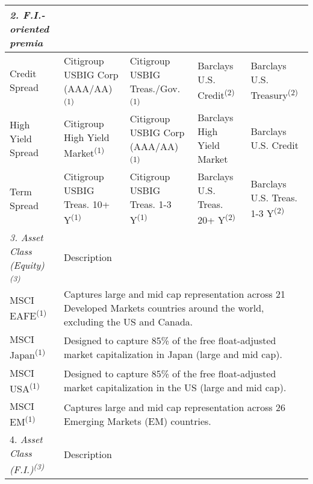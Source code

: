 \documentclass[12pt]{article}
\begin{document}
\begin{table}[H]
{\begin{tabular}{@{}lllll@{}}
\textit{2.   F.I.-oriented premia} & \textit{}                          &                                     &                                    &                                    \\ \midrule
Credit Spread                       & Citigroup USBIG Corp (AAA/AA)\textsuperscript{(1)}      & Citigroup USBIG Treas./Gov.\textsuperscript{(1)}         & Barclays U.S. Credit\textsuperscript{(2)}               & Barclays U.S. Treasury\textsuperscript{(2)}             \\
High Yield Spread                   & Citigroup High Yield Market\textsuperscript{(1)}        & Citigroup USBIG Corp (AAA/AA)\textsuperscript{(1)}       & Barclays High Yield Market         & Barclays U.S. Credit               \\
Term Spread                         & Citigroup USBIG Treas. 10+ Y\textsuperscript{(1)}       & Citigroup USBIG Treas. 1-3 Y\textsuperscript{(1)}        & Barclays U.S. Treas. 20+ Y\textsuperscript{(2)}         & Barclays U.S. Treas. 1-3 Y\textsuperscript{(2)}         \\ \midrule
\textit{3.   Asset Class (Equity)\textsuperscript{(3)}}  & Description                        &                                     &                                    &                                    \\ \midrule
MSCI EAFE\textsuperscript{(1)}                           & \multicolumn{4}{l}{Captures large and mid cap representation across 21 Developed Markets countries around the world, excluding the US and Canada.} \\
MSCI Japan\textsuperscript{(1)}                          & \multicolumn{4}{l}{Designed to capture 85\% of the free float-adjusted market capitalization in Japan (large and mid cap).}                        \\
MSCI USA\textsuperscript{(1)}                            & \multicolumn{4}{l}{Designed to capture 85\% of the free float-adjusted market capitalization in the US (large and mid cap).}                       \\
MSCI EM\textsuperscript{(1)}                             & \multicolumn{4}{l}{Captures large and mid cap representation across 26 Emerging Markets (EM) countries.}                                           \\ \midrule
4.   \textit{Asset Class (F.I.)\textsuperscript{(3)}}             & Description                        &                                     &                                    &                                    \\ \midrule

\end{tabular}}
\end{table}
\end{document}

